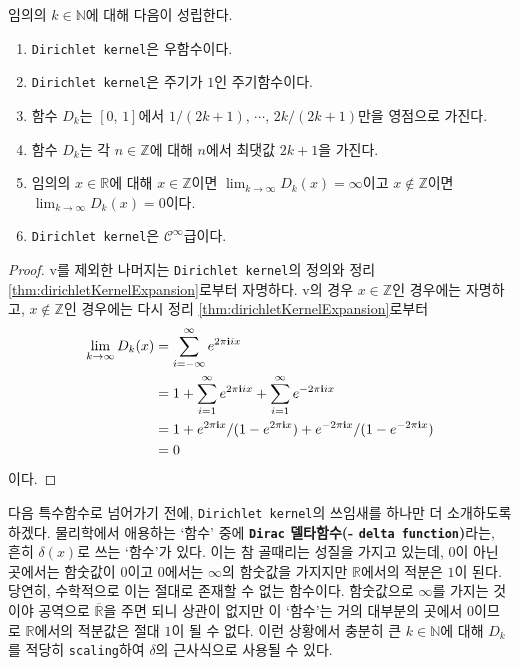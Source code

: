 \begin{theorem}
    임의의 $k\in\mathbb{N}$에 대해 다음이 성립한다.
    \begin{enumerate}
        \item \texttt{Dirichlet kernel}은 우함수이다.
        \item \texttt{Dirichlet kernel}은 주기가 $1$인 주기함수이다.
        \item 함수 $D_k$는 $[0,\,1]$에서 $1/(2k+1),\,\cdots,\,2k/(2k+1)$만을 영점으로 가진다.
        \item 함수 $D_k$는 각 $n\in\mathbb{Z}$에 대해 $n$에서 최댓값 $2k+1$을 가진다.
        \item 임의의 $x\in\mathbb{R}$에 대해 $x\in\mathbb{Z}$이면 $\lim_{k\to\infty}D_k(x)=\infty$이고 $x\notin\mathbb{Z}$이면 $\lim_{k\to\infty}D_k(x)=0$이다.
        \item \texttt{Dirichlet kernel}은 $\mathcal{C}^\infty$급이다.
    \end{enumerate}
\end{theorem}

\begin{proof}
    v를 제외한 나머지는 \texttt{Dirichlet kernel}의 정의와 정리 \ref{thm:dirichletKernelExpansion}로부터 자명하다. v의 경우 $x\in\mathbb{Z}$인 경우에는 자명하고, $x\notin\mathbb{Z}$인 경우에는 다시 정리 \ref{thm:dirichletKernelExpansion}로부터
    \begin{align*}
        \lim_{k\to\infty}D_k(x)&=\sum_{i=-\infty}^\infty e^{2\pi\mathbf{i} ix}\\
        &=1+\sum_{i=1}^\infty e^{2\pi\mathbf{i} ix}+\sum_{i=1}^\infty e^{-2\pi\mathbf{i} ix}\\
        &=1+e^{2\pi\mathbf{i} x}/(1-e^{2\pi\mathbf{i} x})+e^{-2\pi\mathbf{i} x}/(1-e^{-2\pi\mathbf{i} x})\\
        &=0
    \end{align*}
    이다.
\end{proof}

다음 특수함수로 넘어가기 전에, \texttt{Dirichlet kernel}의 쓰임새를 하나만 더 소개하도록 하겠다. 물리학에서 애용하는 `함수' 중에 \textbf{\texttt{Dirac} 델타함수(- \texttt{delta function})}라는, 흔히 $\delta(x)$로 쓰는 `함수'가 있다. 이는 참 골때리는 성질을 가지고 있는데, $0$이 아닌 곳에서는 함숫값이 $0$이고 $0$에서는 $\infty$의 함숫값을 가지지만 $\mathbb{R}$에서의 적분은 $1$이 된다. 당연히, 수학적으로 이는 절대로 존재할 수 없는 함수이다. 함숫값으로 $\infty$를 가지는 것이야 공역으로 $\overline{\mathbb{R}}$을 주면 되니 상관이 없지만 이 `함수'는 거의 대부분의 곳에서 $0$이므로 $\mathbb{R}$에서의 적분값은 절대 $1$이 될 수 없다. 이런 상황에서 충분히 큰 $k\in\mathbb{N}$에 대해 $D_k$를 적당히 \texttt{scaling}하여 $\delta$의 근사식으로 사용될 수 있다.\footnotemark

